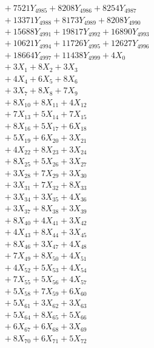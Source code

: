 \documentclass[a4paper,10pt]{article}
\begin{document}
{\begin{align}
&\;  + 7521 Y_{4985} + 8208 Y_{4986} + 8254 Y_{4987} \\[0.3ex]
&\;  + 13371 Y_{4988} + 8173 Y_{4989} + 8208 Y_{4990} \\[0.3ex]
&\;  + 15688 Y_{4991} + 19817 Y_{4992} + 16890 Y_{4993} \\[0.3ex]
&\;  + 10621 Y_{4994} + 11726 Y_{4995} + 12627 Y_{4996} \\[0.3ex]
&\;  + 18664 Y_{4997} + 11438 Y_{4999} + 4 X_{0} \\[0.3ex]
&\;  + 3 X_{1} + 8 X_{2} + 3 X_{3} \\[0.3ex]
&\;  + 4 X_{4} + 6 X_{5} + 8 X_{6} \\[0.3ex]
&\;  + 3 X_{7} + 8 X_{8} + 7 X_{9} \\[0.5ex]\allowbreak
&\;  + 8 X_{10} + 8 X_{11} + 4 X_{12} \\[0.3ex]
&\;  + 7 X_{13} + 5 X_{14} + 7 X_{15} \\[0.3ex]
&\;  + 8 X_{16} + 5 X_{17} + 6 X_{18} \\[0.3ex]
&\;  + 5 X_{19} + 6 X_{20} + 3 X_{21} \\[0.3ex]
&\;  + 4 X_{22} + 8 X_{23} + 3 X_{24} \\[0.3ex]
&\;  + 8 X_{25} + 5 X_{26} + 3 X_{27} \\[0.3ex]
&\;  + 3 X_{28} + 7 X_{29} + 3 X_{30} \\[0.3ex]
&\;  + 3 X_{31} + 7 X_{32} + 8 X_{33} \\[0.3ex]
&\;  + 3 X_{34} + 3 X_{35} + 4 X_{36} \\[0.3ex]
&\;  + 3 X_{37} + 8 X_{38} + 3 X_{39} \\[0.5ex]\allowbreak
&\;  + 8 X_{40} + 4 X_{41} + 3 X_{42} \\[0.3ex]
&\;  + 4 X_{43} + 8 X_{44} + 3 X_{45} \\[0.3ex]
&\;  + 8 X_{46} + 3 X_{47} + 4 X_{48} \\[0.3ex]
&\;  + 7 X_{49} + 8 X_{50} + 4 X_{51} \\[0.3ex]
&\;  + 4 X_{52} + 5 X_{53} + 4 X_{54} \\[0.3ex]
&\;  + 7 X_{55} + 5 X_{56} + 4 X_{57} \\[0.3ex]
&\;  + 5 X_{58} + 7 X_{59} + 6 X_{60} \\[0.3ex]
&\;  + 5 X_{61} + 3 X_{62} + 3 X_{63} \\[0.3ex]
&\;  + 5 X_{64} + 8 X_{65} + 5 X_{66} \\[0.3ex]
&\;  + 6 X_{67} + 6 X_{68} + 3 X_{69} \\[0.5ex]\allowbreak
&\;  + 8 X_{70} + 6 X_{71} + 5 X_{72} \\[0.3ex]

\end{align}}
\end{document}
